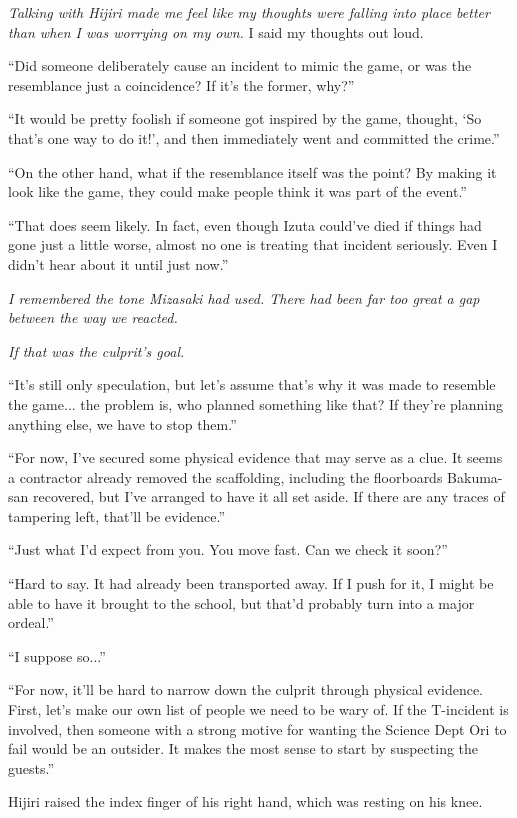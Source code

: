 \documentclass[
    a4paper,
    12pt,
    twoside,
    openany,
    UTF8,
    fontset=windows
]{ctexbook}
\begin{document}
\textit{Talking with Hijiri made me feel like my thoughts were falling into place better than when I was worrying on my own.} I said my thoughts out loud.

``Did someone deliberately cause an incident to mimic the game, or was the resemblance just a coincidence? If it's the former, why?''

``It would be pretty foolish if someone got inspired by the game, thought, `So that's one way to do it!', and then immediately went and committed the crime.''

``On the other hand, what if the resemblance itself was the point? By making it look like the game, they could make people think it was part of the event.''

``That does seem likely. In fact, even though Izuta could've died if things had gone just a little worse, almost no one is treating that incident seriously. Even I didn't hear about it until just now.''

\textit{I remembered the tone Mizasaki had used. There had been far too great a gap between the way we reacted.}

\textit{If that was the culprit's goal.}

``It's still only speculation, but let's assume that's why it was made to resemble the game... the problem is, who planned something like that? If they're planning anything else, we have to stop them.''

``For now, I've secured some physical evidence that may serve as a clue. It seems a contractor already removed the scaffolding, including the floorboards Bakuma-san recovered, but I've arranged to have it all set aside. If there are any traces of tampering left, that'll be evidence.''

``Just what I'd expect from you. You move fast. Can we check it soon?''

``Hard to say. It had already been transported away. If I push for it, I might be able to have it brought to the school, but that'd probably turn into a major ordeal.''

``I suppose so...''

``For now, it'll be hard to narrow down the culprit through physical evidence. First, let's make our own list of people we need to be wary of. If the T-incident is involved, then someone with a strong motive for wanting the Science Dept Ori to fail would be an outsider. It makes the most sense to start by suspecting the guests.''

Hijiri raised the index finger of his right hand, which was resting on his knee.
\end{document}
